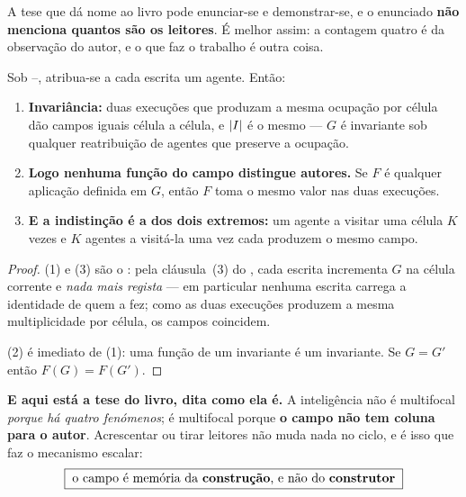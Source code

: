 \documentclass[../livro.tex]{subfiles}
\begin{document}
\noindent A tese que dá nome ao livro pode enunciar-se e demonstrar-se, e o
enunciado \textbf{não menciona quantos são os leitores}. É melhor assim: a
contagem quatro é da observação do autor, e o que faz o trabalho é outra coisa.

\begin{teorema}\label{mf:thm:multifocal}
Sob --, atribua-se a cada escrita um agente. Então:
\begin{enumerate}\itemsep3pt
\item[(1)] \textbf{Invariância:} duas execuções que produzam a mesma ocupação
por célula dão campos iguais célula a célula, e $\lvert I\rvert$ é o mesmo --- $G$ é
invariante sob qualquer reatribuição de agentes que preserve a ocupação.
\item[(2)] \textbf{Logo nenhuma função do campo distingue autores.} Se $F$ é
qualquer aplicação definida em $G$, então $F$ toma o mesmo valor nas duas
execuções.
\item[(3)] \textbf{E a indistinção é a dos dois extremos:} um agente a visitar
uma célula $K$ vezes e $K$ agentes a visitá-la uma vez cada produzem o mesmo
campo.
\end{enumerate}
\end{teorema}

\begin{proof}
(1) e (3) são o : pela
cláusula~(3) do , cada
escrita incrementa $G$ na célula corrente e \emph{nada mais regista} --- em
particular nenhuma escrita carrega a identidade de quem a fez; como as duas
execuções produzem a mesma multiplicidade por célula, os campos coincidem.

(2) é imediato de (1): uma função de um invariante é um invariante. Se
$G=G'$ então $F(G)=F(G')$.
\end{proof}

\medskip\noindent\textbf{E aqui está a tese do livro, dita como ela é.} A
inteligência não é multifocal \emph{porque há quatro fenómenos}; é multifocal
porque \textbf{o campo não tem coluna para o autor}. Acrescentar ou tirar
leitores não muda nada no ciclo, e é isso que faz o mecanismo escalar:
\[
\boxed{\;\text{o campo é memória da \textbf{construção}, e não do
\textbf{construtor}}\;}
\]
\end{document}
